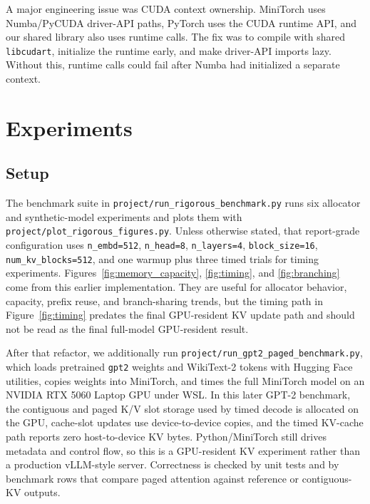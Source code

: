 \documentclass{article}
\begin{document}
A major engineering issue was CUDA context ownership.  MiniTorch uses Numba/PyCUDA driver-API paths, PyTorch uses the CUDA runtime API, and our shared library also uses runtime calls.  The fix was to compile with shared \texttt{libcudart}, initialize the runtime early, and make driver-API imports lazy.  Without this, runtime calls could fail after Numba had initialized a separate context.

\section{Experiments}

\subsection{Setup}

The benchmark suite in \texttt{project/run\_rigorous\_benchmark.py} runs six allocator and synthetic-model experiments and plots them with \texttt{project/plot\_rigorous\_figures.py}.  Unless otherwise stated, that report-grade configuration uses \texttt{n\_embd=512}, \texttt{n\_head=8}, \texttt{n\_layers=4}, \texttt{block\_size=16}, \texttt{num\_kv\_blocks=512}, and one warmup plus three timed trials for timing experiments.  Figures~\ref{fig:memory_capacity}, \ref{fig:timing}, and \ref{fig:branching} come from this earlier implementation.  They are useful for allocator behavior, capacity, prefix reuse, and branch-sharing trends, but the timing path in Figure~\ref{fig:timing} predates the final GPU-resident KV update path and should not be read as the final full-model GPU-resident result.

After that refactor, we additionally run \texttt{project/run\_gpt2\_paged\_benchmark.py}, which loads pretrained \texttt{gpt2} weights and WikiText-2 tokens with Hugging Face utilities, copies weights into MiniTorch, and times the full MiniTorch model on an NVIDIA RTX 5060 Laptop GPU under WSL.  In this later GPT-2 benchmark, the contiguous and paged K/V slot storage used by timed decode is allocated on the GPU, cache-slot updates use device-to-device copies, and the timed KV-cache path reports zero host-to-device KV bytes.  Python/MiniTorch still drives metadata and control flow, so this is a GPU-resident KV experiment rather than a production vLLM-style server.  Correctness is checked by unit tests and by benchmark rows that compare paged attention against reference or contiguous-KV outputs.
\end{document}

